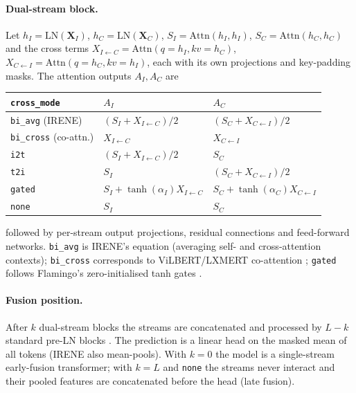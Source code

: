 \paragraph{Dual-stream block.} Let $h_I=\mathrm{LN}(\mathbf{X}_I)$, $h_C=\mathrm{LN}(\mathbf{X}_C)$,
$S_I=\mathrm{Attn}(h_I,h_I)$, $S_C=\mathrm{Attn}(h_C,h_C)$ and the cross terms
$X_{I\leftarrow C}=\mathrm{Attn}(q{=}h_I,kv{=}h_C)$, $X_{C\leftarrow I}=\mathrm{Attn}(q{=}h_C,kv{=}h_I)$,
each with its own projections and key-padding masks. The attention outputs $A_I, A_C$ are
\begin{center}
\small
\begin{tabular}{@{}lll@{}}
\toprule
\texttt{cross\_mode} & $A_I$ & $A_C$ \\
\midrule
\texttt{bi\_avg} (IRENE) & $(S_I+X_{I\leftarrow C})/2$ & $(S_C+X_{C\leftarrow I})/2$\\
\texttt{bi\_cross} (co-attn.) & $X_{I\leftarrow C}$ & $X_{C\leftarrow I}$\\
\texttt{i2t} & $(S_I+X_{I\leftarrow C})/2$ & $S_C$\\
\texttt{t2i} & $S_I$ & $(S_C+X_{C\leftarrow I})/2$\\
\texttt{gated} & $S_I+\tanh(\alpha_I)X_{I\leftarrow C}$ & $S_C+\tanh(\alpha_C)X_{C\leftarrow I}$\\
\texttt{none} & $S_I$ & $S_C$\\
\bottomrule
\end{tabular}
\end{center}
followed by per-stream output projections, residual connections and feed-forward networks.
\texttt{bi\_avg} is IRENE's equation (averaging self- and cross-attention contexts);
\texttt{bi\_cross} corresponds to ViLBERT/LXMERT co-attention \citep{lu2019vilbert,tan2019lxmert};
\texttt{gated} follows Flamingo's zero-initialised tanh gates \citep{alayrac2022flamingo}.

\paragraph{Fusion position.} After $k$ dual-stream blocks the streams are concatenated and
processed by $L-k$ standard pre-LN blocks \citep{vaswani2017attention}. The prediction is a
linear head on the masked mean of all tokens (IRENE also mean-pools). With $k=0$ the model is a
single-stream early-fusion transformer; with $k=L$ and \texttt{none} the streams never interact
and their pooled features are concatenated before the head (late fusion).

